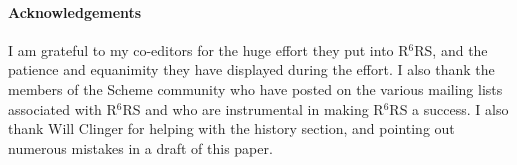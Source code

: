 \documentclass{acm_proc_article-sp}
\newcommand{\rn}[1]{R$^{#1}$RS}
\begin{document}
\paragraph*{Acknowledgements} I am grateful to my co-editors for the
huge effort they put into \rn{6}, and the patience and equanimity they
have displayed during the effort.  I also thank the members of the Scheme
community who have posted on the various mailing lists associated with
\rn{6} and who are instrumental in making \rn{6} a success.  I also
thank Will Clinger for helping with the history section, and
pointing out numerous mistakes in a draft of this paper.



\end{document}
